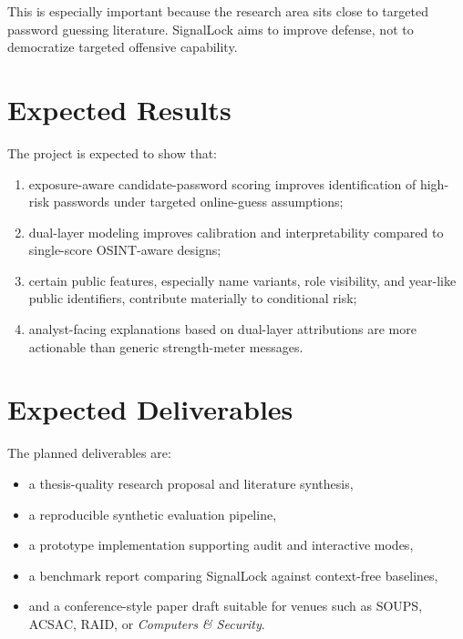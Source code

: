 \documentclass[11pt]{article}
\begin{document}
This is especially important because the research area sits close to targeted password guessing literature. SignalLock aims to improve defense, not to democratize targeted offensive capability.

\section{Expected Results}
The project is expected to show that:

\begin{enumerate}[leftmargin=*]
  \item exposure-aware candidate-password scoring improves identification of high-risk passwords under targeted online-guess assumptions;
  \item dual-layer modeling improves calibration and interpretability compared to single-score OSINT-aware designs;
  \item certain public features, especially name variants, role visibility, and year-like public identifiers, contribute materially to conditional risk;
  \item analyst-facing explanations based on dual-layer attributions are more actionable than generic strength-meter messages.
\end{enumerate}

\section{Expected Deliverables}
The planned deliverables are:

\begin{itemize}[leftmargin=*]
  \item a thesis-quality research proposal and literature synthesis,
  \item a reproducible synthetic evaluation pipeline,
  \item a prototype implementation supporting audit and interactive modes,
  \item a benchmark report comparing SignalLock against context-free baselines,
  \item and a conference-style paper draft suitable for venues such as SOUPS, ACSAC, RAID, or \emph{Computers \& Security}.
\end{itemize}
\end{document}
